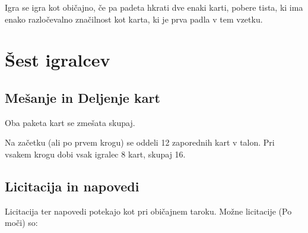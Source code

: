 \documentclass[a4paper, ]{report}
\begin{document}
Igra se igra kot običajno, če pa padeta hkrati dve enaki karti, pobere tista, ki ima enako razločevalno značilnost kot karta, ki je prva padla v tem vzetku.

\part{Šest igralcev}

\chapter{Mešanje in Deljenje kart}

Oba paketa kart se zmešata skupaj.

Na začetku (ali po prvem krogu) se oddeli 12 zaporednih kart v talon. Pri vsakem krogu dobi vsak igralec 8 kart, skupaj 16.

\chapter{Licitacija in napovedi}

Licitacija ter napovedi potekajo kot pri običajnem taroku.
Možne licitacije (Po moči) so:
\end{document}
